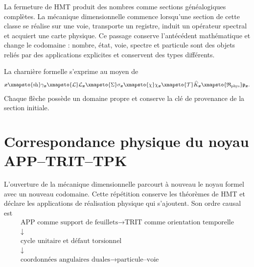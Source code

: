 \label{chap:realizacion-espectral-numero-particula}

La fermeture de HMT produit des nombres comme sections généalogiques complètes. La
mécanique dimensionnelle commence lorsqu'une section de cette classe se réalise sur
une voie, transporte un registre, induit un opérateur spectral et acquiert une
carte physique. Ce passage conserve l'antécédent mathématique et change le
codomaine : nombre, état, voie, spectre et particule sont des objets reliés
par des applications explicites et conservent des types différents.

La charnière formelle s'exprime au moyen de
\begin{equation}
 \boldsymbol x
 \xmapsto{\operatorname{sh}}
 \gamma_{\boldsymbol x}
 \xmapsto{\mathcal L}
 \mathcal L_{\boldsymbol x}
 \xmapsto{\Sigma}
 \sigma_{\boldsymbol x}
 \xmapsto{\chi}
 \chi_{\boldsymbol x}
 \xmapsto{\mathcal T}
 \widehat K_{\boldsymbol x}
 \xmapsto{\mathfrak R_{\rm phys}}
 \mathfrak p_{\boldsymbol x}.
 \label{eq:bisagra-numero-espectro-particula}
\end{equation}
Chaque flèche possède un domaine propre et conserve la clé de provenance de la
section initiale.

\section{Correspondance physique du noyau APP--TRIT--TPK}
\label{sec:reaplicacion-fisica-app-trit-tpk}

L'ouverture de la mécanique dimensionnelle parcourt à nouveau le noyau formel avec
un nouveau codomaine. Cette répétition conserve les théorèmes de HMT et déclare
les applications de réalisation physique qui s'ajoutent. Son ordre causal est
\[
 \boxed{\begin{gathered}
 \text{APP comme support de feuillets}
 \longrightarrow \text{TRIT comme orientation temporelle}\\
 \downarrow\\[-1mm]
 \text{cycle unitaire et défaut torsionnel}\\
 \downarrow\\[-1mm]
 \text{coordonnées angulaires duales}
 \longrightarrow \text{particule--voie}
 \end{gathered}}
\]

